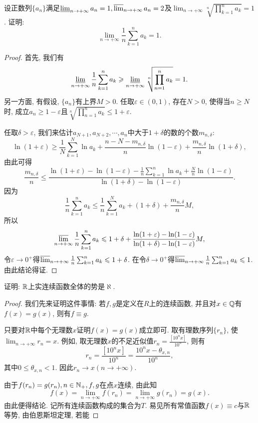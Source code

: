 \begin{quizb}
\begin{solution}
\end{solution}
\woe 设正数列\(\{a_n\}\)满足\(\varliminf_{n\rightarrow+\infty}a_n=1,\varlimsup_{n\rightarrow+\infty}a_n=2\)及\(\lim_{n\rightarrow+\infty}\sqrt[n]{\prod_{k=1}^{n}a_k}=1\). 证明: \[\lim_{n\rightarrow+\infty}\frac{1}{n}\sum_{k=1}^{n}a_k=1.\]
\begin{proof}
首先, 我们有\[\varliminf_{n\rightarrow+\infty}\frac{1}{n}\sum_{k=1}^{n}a_k\geqslant \varliminf_{n\rightarrow+\infty}\sqrt[n]{\displaystyle\prod_{n=1}^{n}a_k}=1.\]另一方面, 有假设, \(\{a_n\}\)有上界\(M>0\). 任取\(\varepsilon\in(0,1)\), 存在\(N>0\), 使得当\(n\geqslant N\)时, 成立\(a_n\geqslant 1-\varepsilon\)且\(\sqrt[n]{\displaystyle\prod_{n=1}^{n}a_k}\leqslant 1+\varepsilon\).

任取\(\delta>\varepsilon\), 我们来估计\(a_{N+1},a_{N+2},\cdots,a_n\)中大于\(1+\delta\)的数的个数\(m_{n,\delta}\):\[\ln(1+\varepsilon)\geqslant\frac{1}{N}\sum_{k=1}^{N}\ln a_k+\frac{n-N-m_{n,\delta}}{n}\ln(1-\varepsilon)+\frac{m_{n,\delta}}{n}\ln(1+\delta),\]由此可得\[\frac{m_{n,\delta}}{n}\leqslant\frac{\displaystyle\ln(1+\varepsilon)-\ln(1-\varepsilon)-\frac{1}{n}\sum_{k=1}^{n}\ln a_k+\frac{N}{n}\ln(1-\varepsilon)}{\ln(1+\delta)-\ln(1-\varepsilon)}.\]因为\[\frac{1}{n}\sum_{k=1}^{n}a_k\leqslant\frac{1}{n}\sum_{k=1}^{N}a_k+(1+\delta)+\frac{m_{n,\delta}}{n}M,\]所以\[\varlimsup_{n\rightarrow+\infty}\frac{1}{n}\sum_{k=1}^{n}a_k\leqslant 1+\delta+\frac{\ln(1+\varepsilon)-\ln(1-\varepsilon)}{\ln(1+\delta)-\ln(1-\varepsilon)}M,\]令\(\varepsilon\rightarrow 0^+\)得\(\varlimsup_{n\rightarrow+\infty}\frac{1}{n}\sum_{k=1}^{n}a_k\leqslant 1+\delta\). 在令\(\delta\rightarrow 0^+\)得\(\varlimsup_{n\rightarrow+\infty}\frac{1}{n}\sum_{k=1}^{n}a_k\leqslant 1\). 由此结论得证.
\end{proof}
\woe 证明: \(\mathbb{R}\)上实连续函数全体的势是\(\aleph\).
\begin{proof}
我们先来证明这件事情: 若\(f,g\)是定义在\(R\)上的连续函数, 并且对\(x\in\mathbb{Q}\)有\(f(x)=g(x)\), 则有\(f\equiv g\).

只要对\(\mathbb{R}\)中每个无理数\(x\)证明\(f(x)=g(x)\)成立即可. 取有理数序列\(\{r_n\}\), 使\(\lim_{n\rightarrow+\infty}r_n=x\). 例如, 取无理数\(x\)的不足近似值\(r_n=\frac{\left[10^nx\right]}{10^n}\), 则有\[r_n=\frac{\left[10^nx\right]}{10^n}=\frac{10^nx-\theta_{x,n}}{10^n},\]其中\(0\leqslant\theta_{x,n}<1\). 因此\(r_n\rightarrow x(n\rightarrow+\infty)\).

由于\(f(r_n)=g(r_n),n\in\mathbb{N}_+,f,g\)在点\(x\)连续, 由此知\[f(x)=\lim_{n\rightarrow+\infty}f(r_n)=\lim_{n\rightarrow+\infty}g(r_n)=g(x).\]
由此便得结论. 记所有连续函数构成的集合为\(T\). 易见所有常值函数\(f(x)\equiv c\)与\(\mathbb{R}\)等势, 由伯恩斯坦定理, 若能

\end{proof}
\end{quizb}
